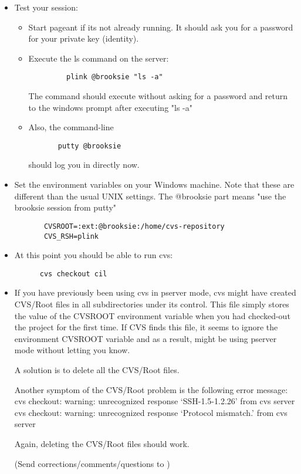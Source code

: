 \documentclass{book}
\begin{document}
\begin{itemize}
\item Test your session:
  \begin{itemize}
  \item Start pageant if its not already running. It should ask you for a
    password for your private key (identity). 
  \item Execute the ls command on the server:

\begin{verbatim}
	     plink @brooksie "ls -a"
\end{verbatim}

     The command should execute without asking for a password and return to the 
     windows prompt after executing "ls -a"

   \item Also, the command-line
\begin{verbatim}
	   putty @brooksie
\end{verbatim}
     should log you in directly now.
  \end{itemize}

\item Set the environment variables on your Windows machine. Note that these
are different than the usual UNIX settings. The @brooksie part means "use the
brooksie session from putty"

\begin{verbatim}
       CVSROOT=:ext:@brooksie:/home/cvs-repository
       CVS_RSH=plink
\end{verbatim}

\item At this point you should be able to run cvs:

\begin{verbatim}
      cvs checkout cil
\end{verbatim}

\item If you have previously been using cvs in pserver mode, cvs might have
created CVS/Root files in all subdirectories under its control. This file
simply stores the value of the CVSROOT environment variable when you had
checked-out the project for the first time. If CVS finds this file, it seems
to ignore the environment CVSROOT variable and as a result, might be using
pserver mode without letting you know.
   
   A solution is to delete all the CVS/Root files.

   Another symptom of the CVS/Root problem is the following error message:
   cvs checkout: warning: unrecognized response `SSH-1.5-1.2.26' from cvs server
   cvs checkout: warning: unrecognized response `Protocol mismatch.' from cvs	
   server

   Again, deleting the CVS/Root files should work.


(Send corrections/comments/questions to )
\end{itemize}
\end{document}
